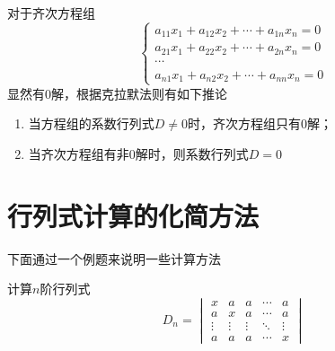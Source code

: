 对于齐次方程组
\[
    \begin{cases}
        a_{11}x_1 + a_{12}x_2 + \cdots + a_{1n}x_n = 0 \\
        a_{21}x_1 + a_{22}x_2 + \cdots + a_{2n}x_n = 0 \\
        \cdots                                         \\
        a_{n1}x_1 + a_{n2}x_2 + \cdots + a_{nn}x_n = 0
    \end{cases}
\]
显然有$0$解，根据克拉默法则有如下推论
\begin{enumerate}[(1)]
    \item 当方程组的系数行列式$D\neq 0$时，齐次方程组只有$0$解；
    \item 当齐次方程组有非$0$解时，则系数行列式$D=0$
\end{enumerate}

\section{行列式计算的化简方法}
下面通过一个例题来说明一些计算方法
\begin{example}
    计算$n$阶行列式
    \[
        D_n =
        \begin{vmatrix}
            x      & a      & a      & \cdots & a      \\
            a      & x      & a      & \cdots & a      \\
            \vdots & \vdots & \vdots & \ddots & \vdots \\
            a      & a      & a      & \cdots & x
        \end{vmatrix}
    \]
\end{example}
